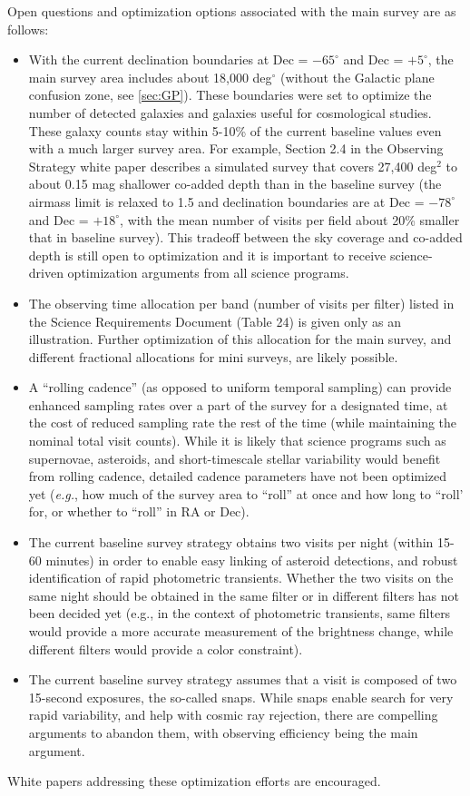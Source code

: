 \documentclass[DM,lsstdraft,toc,usenatbib]{lsstdoc}
\begin{document}
Open questions and optimization options associated with the main survey are as follows: 
\begin{itemize}
\item With the current declination boundaries at Dec = $-65^\circ$ and Dec = $+5^\circ$,
the main survey area includes about 18,000 deg$^\circ$ (without the Galactic plane 
confusion zone, see \ref{sec:GP}). These boundaries were set to optimize the number of
detected galaxies and galaxies useful for cosmological studies. These galaxy counts 
stay within 5-10\% of the current baseline values even with a much larger survey area. 
For example, Section 2.4 in the Observing Strategy white paper describes a simulated survey
that covers 27,400 deg$^2$ to about 0.15 mag shallower co-added depth than in the baseline 
survey (the airmass limit is relaxed to 1.5 and declination boundaries are at Dec = $-78^\circ$ 
and Dec = $+18^\circ$, with the mean number of visits per field about 20\% smaller that
in baseline survey). This tradeoff between the sky coverage and co-added depth is still
open to optimization and it is important to receive science-driven optimization arguments
from all science programs. 
\item The observing time allocation per band (number of visits per filter) listed in the Science Requirements Document
(Table 24) is given only as an illustration. Further optimization of this allocation for the main 
survey, and different fractional allocations for mini surveys, are likely possible. 
\item A ``rolling cadence'' (as opposed to uniform temporal sampling) can provide enhanced
sampling rates over a part of the survey for a designated time, at the
cost of reduced sampling rate the rest of the time (while maintaining the nominal total 
visit counts). While it is likely that science programs such as supernovae, asteroids, and
short-timescale stellar variability would benefit from rolling cadence, detailed cadence
parameters have not been optimized yet ({\it e.g.}, how much of the 
survey area to ``roll'' at once and how long to ``roll' for, or whether to ``roll'' in RA or Dec). 
\item The current baseline survey strategy obtains two visits per night (within 15-60 minutes) in 
order to enable easy linking of asteroid detections, and robust identification of rapid 
photometric transients. Whether the two visits on the same night should be obtained 
in the same filter or in different filters has not been decided yet (e.g., in the context
of photometric transients, same filters would provide a more accurate measurement
of the brightness change, while different filters would provide a color constraint). 
\item The current baseline survey strategy assumes that a visit is composed of two 15-second
exposures, the so-called snaps. While snaps enable search for very rapid variability,
and help with cosmic ray rejection, there are compelling arguments to abandon
them, with observing efficiency being the main argument. 
\end{itemize}
White papers addressing these optimization efforts are encouraged.
\end{document}
